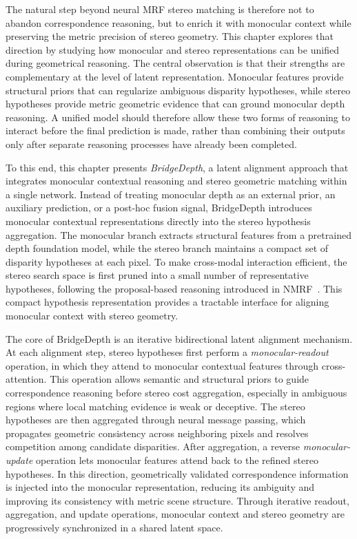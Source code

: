 The natural step beyond neural MRF stereo matching is therefore not to abandon correspondence reasoning, but to enrich it with monocular context while preserving the metric precision of stereo geometry.
This chapter explores that direction by studying how monocular and stereo representations can be unified during geometrical reasoning.
The central observation is that their strengths are complementary at the level of latent representation.
Monocular features provide structural priors that can regularize ambiguous disparity hypotheses, while stereo hypotheses provide metric geometric evidence that can ground monocular depth reasoning.
A unified model should therefore allow these two forms of reasoning to interact before the final prediction is made, rather than combining their outputs only after separate reasoning processes have already been completed.

To this end, this chapter presents \emph{BridgeDepth}, a latent alignment approach that integrates monocular contextual reasoning and stereo geometric matching within a single network.
Instead of treating monocular depth as an external prior, an auxiliary prediction, or a post-hoc fusion signal, BridgeDepth introduces monocular contextual representations directly into the stereo hypothesis aggregation.
The monocular branch extracts structural features from a pretrained depth foundation model, while the stereo branch maintains a compact set of disparity hypotheses at each pixel.
To make cross-modal interaction efficient, the stereo search space is first pruned into a small number of representative hypotheses, following the proposal-based reasoning introduced in NMRF~\cite{guan2024neural}.
This compact hypothesis representation provides a tractable interface for aligning monocular context with stereo geometry.

The core of BridgeDepth is an iterative bidirectional latent alignment mechanism.
At each alignment step, stereo hypotheses first perform a \emph{monocular-readout} operation, in which they attend to monocular contextual features through cross-attention.
This operation allows semantic and structural priors to guide correspondence reasoning before stereo cost aggregation, especially in ambiguous regions where local matching evidence is weak or deceptive.
The stereo hypotheses are then aggregated through neural message passing, which propagates geometric consistency across neighboring pixels and resolves competition among candidate disparities.
After aggregation, a reverse \emph{monocular-update} operation lets monocular features attend back to the refined stereo hypotheses.
In this direction, geometrically validated correspondence information is injected into the monocular representation, reducing its ambiguity and improving its consistency with metric scene structure.
Through iterative readout, aggregation, and update operations, monocular context and stereo geometry are progressively synchronized in a shared latent space.


